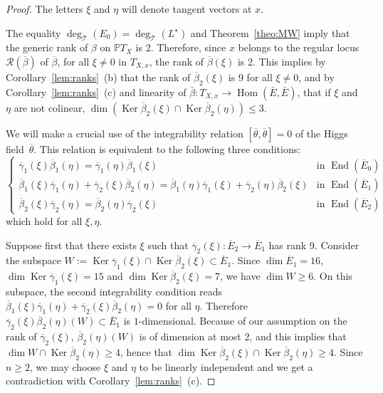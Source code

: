 \documentclass[10pt]{amsart}
\let\mathcal\mathscr
\theoremstyle{plain}
\theoremstyle{definition}
\let\ov\overline
\DeclareMathOperator{\End}{End}
\DeclareMathOperator{\Hom}{Hom}
\DeclareMathOperator{\Ker}{Ker}
\newcommand{\cR}{\mathcal{R}}
\newcommand{\cT}{\mathcal{T}}
\newcommand{\PTX}{{\mathbb{P}T_X}}
\newcommand{\ovE}{\ov{E}}
\newcommand{\ovb}{\ov{\beta}}
\newcommand{\ovg}{\ov{\gamma}}
\newcommand{\ovt}{\ov{\theta}}
\begin{document}
\begin{proof}
The
letters $\xi$ and $\eta$ will denote tangent
vectors at $x$.

The equality $\deg_\cT(E_0)=\deg_\cT(L^\star)$ and Theorem~\ref{theo:MW} imply that the generic rank
of $\beta$ on $\PTX$ is 2. Therefore, since
$x$ belongs to the regular locus $\cR(\ovb)$ of $\ovb$, for all $\xi\neq 0$ in $T_{X,x}$, the
rank of $\ovb(\xi)$ is 2. This implies by
Corollary~\ref{lem:ranks}~(b) that the rank of $\ovb_2(\xi)$ is 9 for all $\xi\neq 0$, and by
Corollary~\ref{lem:ranks}~(c) and linearity of $\bar\beta: T_{X,x}\to \Hom(\bar E,\bar E)$, that if $\xi$
and $\eta$ are not colinear, $\dim(\Ker\ovb_2(\xi)\cap\Ker\ovb_2(\eta))\leq 3$.

We will make a crucial use of the
integrability relation $[\ovt,\ovt]=0$ of the Higgs field~$\ovt$. This relation is equivalent to the
following three conditions:
$$
\begin{cases}
\ovg_1(\xi)\ovb_1(\eta) = \ovg_1(\eta)\ovb_1(\xi) & \mbox{in } \End(\ovE_0)\\
\ovb_1(\xi)\ovg_1(\eta)+\ovg_2(\xi)\ovb_2(\eta) = \ovb_1(\eta)\ovg_1(\xi)+\ovg_2(\eta)\ovb_2(\xi) & \mbox{in } \End(\ovE_1) \\
\ovb_2(\xi)\ovg_2(\eta) = \ovb_2(\eta)\ovg_2(\xi) & \mbox{in } \End(\ovE_2)
\end{cases}
$$
which hold for all $\xi,\eta$.

Suppose first that there exists $\xi$ such that $\ovg_2(\xi):\ovE_2\to \ovE_1$ has rank 9. Consider
the subspace
$W:=\Ker\ovg_1(\xi)\cap\Ker \ovb_2(\xi)\subset \ovE_1$. Since $\dim \ovE_1=16$, $\dim
\Ker\ovg_1(\xi)=15$ and
$\dim\Ker\ovb_2(\xi)=7$, we have $\dim W\geq 6$. On this subspace, the second integrability
condition
reads $\ovb_1(\xi)\ovg_1(\eta)+\ovg_2(\xi)\ovb_2(\eta) =0$ for all $\eta$. Therefore
\hbox{$\ovg_2(\xi)\ovb_2(\eta)(W)\subset \ovE_1$} is
$1$-dimensional. Because of our assumption on the rank of $\ovg_2(\xi)$, $\ovb_2(\eta)(W)$ is of
dimension at most 2, and this implies that $\dim W\cap\Ker \ovb_2(\eta)\geq 4$, hence that $\dim
\Ker\ovb_2(\xi)\cap\Ker\ovb_2(\eta)\geq 4$. Since $n\geq 2$, we may choose $\xi$ and $\eta$ to be
linearly independent and we get a contradiction with Corollary~\ref{lem:ranks}~(c).


\end{proof}
\end{document}
